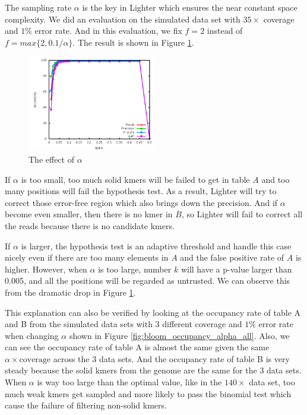 \documentclass[10pt]{article}
\begin{document}
The sampling rate $\alpha$ is the key in Lighter which ensures the near constant space complexity. We did an evaluation on the simulated data set with $35\times$ coverage and $1\%$ error rate. And in this evaluation, we fix $f=2$ instead of $f=max\{2,0.1/\alpha\}$. The result is shown in Figure \ref{fig:alpha}.

\begin{figure}[h!]
\begin{center}
\includegraphics[width=0.5\textwidth]{alpha.png}
\caption{The effect of $\alpha$\label{fig:alpha}}
\end{center}
\end{figure}

If $\alpha$ is too small, too much solid kmers will be failed to get in table $A$ and too many positions will fail the hypothesis test. As a result, Lighter will try to correct those error-free region which also brings down the precision. And if $\alpha$ become even smaller, then there is no kmer in $B$, so Lighter will fail to correct all the reads because there is no candidate kmers. 

If $\alpha$ is larger, the hypothesis test is an adaptive threshold and handle this case nicely even if there are too many elements in $A$ and the false positive rate of $A$ is higher. However, when $\alpha$ is too large, number $k$ will have a p-value larger than 0.005, and all the positions will be regarded as untrusted. We can observe this from the dramatic drop in Figure \ref{fig:alpha}.

This explanation can also be verified by looking at the occupancy rate of table A and B from the simulated data sets with 3 different coverage and $1\%$ error rate when changing $\alpha$ shown in Figure \ref{fig:bloom_occupancy_alpha_all}. Also, we can see the occupancy rate of table A is almost the same given the same $\alpha\times\mbox{coverage}$ across the 3 data sets. And the occupancy rate of table B is very steady because the solid kmers from the genome are the same for the 3 data sets. When $\alpha$ is way too large than the optimal value, like in the $140\times$ data set, too much weak kmers get sampled and more likely to pass the binomial test which cause the failure of filtering non-solid kmers.
\end{document}
